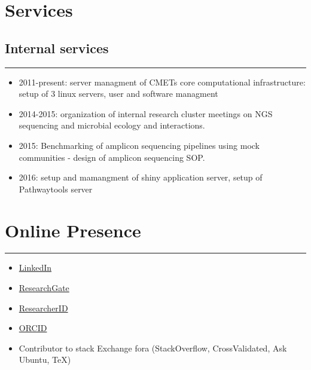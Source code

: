 \documentclass[a4paper,11pt,oneside]{article}
\begin{document}
\section*{Services}

\subsection*{Internal services}
\rule{\textwidth}{1pt}
\begin{itemize}
	\item 2011-present: server managment of CMETs core computational infrastructure: setup of 3 linux servers, user and software managment
	\item 2014-2015: organization of internal research cluster meetings on NGS sequencing and microbial ecology and interactions.
	\item 2015: Benchmarking of amplicon sequencing pipelines using mock communities - design of amplicon sequencing SOP.
	\item 2016: setup and mamangment of shiny application server, setup of Pathwaytools server
\end{itemize}
\section*{Online Presence}
\rule{\textwidth}{1pt}
\begin{itemize}
  \item \href{https://www.linkedin.com/pub/frederiek-maarten-kerckhof/26/b47/668}{LinkedIn}
  \item \href{https://www.researchgate.net/profile/Frederiek-Maarten_Kerckhof}{ResearchGate}
  \item \href{http://www.researcherid.com/ProfileView.action?SID=V2bGbhtEe1TlsfIEXBz&returnCode=ROUTER.Success&queryString=KG0UuZjN5WlUD2sX8KoC12Tw17vPT2A6ocQ5tgzRDDI\%253D\&SrcApp=CR\&Init=Yes}{ResearcherID}
  \item \href{http://orcid.org/0000-0002-4472-6810}{ORCID}
  \item Contributor to stack Exchange fora (StackOverflow, CrossValidated, Ask Ubuntu, TeX)
\end{itemize}

\newpage
\renewcommand{\refname}{Academic publications and conference proceedings} %
\renewcommand{\bibname}{Academic publications and conference proceedings} %
\nocite{*}


%
\end{document}
